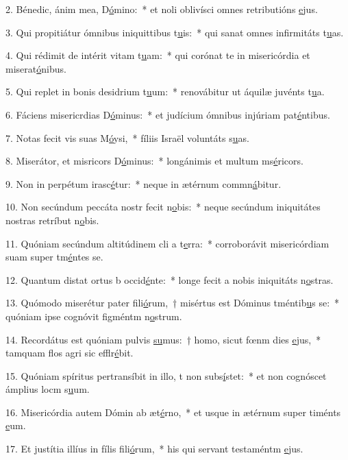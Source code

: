 2. Bénedic, ánim mea, D\uline{ó}mino:~* et noli oblivísci omnes retributións \uline{e}jus.\par 
3. Qui propitiátur ómnibus iniquittibus t\uline{u}is:~* qui sanat omnes infirmitáts t\uline{u}as.\par 
4. Qui rédimit de intérit vitam t\uline{u}am:~* qui corónat te in misericórdia et miserat\uline{ó}nibus.\par 
5. Qui replet in bonis desidrium t\uline{u}um:~* renovábitur ut áquilæ juvénts t\uline{u}a.\par 
6. Fáciens misericrdias D\uline{ó}minus:~* et judícium ómnibus injúriam pat\uline{é}ntibus.\par 
7. Notas fecit vis suas M\uline{ó}ysi,~* fíliis Israël voluntáts s\uline{u}as.\par 
8. Miserátor, et misricors D\uline{ó}minus:~* longánimis et multum ms\uline{é}ricors.\par 
9. Non in perpétum irasc\uline{é}tur:~* neque in ætérnum commn\uline{á}bitur.\par 
10. Non secúndum peccáta nostr fecit n\uline{o}bis:~* neque secúndum iniquitátes nostras retríbut n\uline{o}bis.\par 
11. Quóniam secúndum altitúdinem cli a t\uline{e}rra:~* corroborávit misericórdiam suam super tm\uline{é}ntes se.\par 
12. Quantum distat ortus b occid\uline{é}nte:~* longe fecit a nobis iniquitáts n\uline{o}stras.\par 
13. Quómodo miserétur pater fili\uline{ó}rum,~† misértus est Dóminus tméntib\uline{u}s se:~* quóniam ipse cognóvit figméntm n\uline{o}strum.\par 
14. Recordátus est quóniam pulvis \uline{su}mus:~† homo, sicut fœnm dies \uline{e}jus,~* tamquam flos agri sic efflr\uline{é}bit.\par 
15. Quóniam spíritus pertransíbit in illo, t non subs\uline{í}stet:~* et non cognóscet ámplius locm s\uline{u}um.\par 
16. Misericórdia autem Dómin ab æt\uline{é}rno,~* et usque in ætérnum super timénts \uline{e}um.\par 
17. Et justítia illíus in fílis fili\uline{ó}rum,~* his qui servant testaméntm \uline{e}jus.\par 
